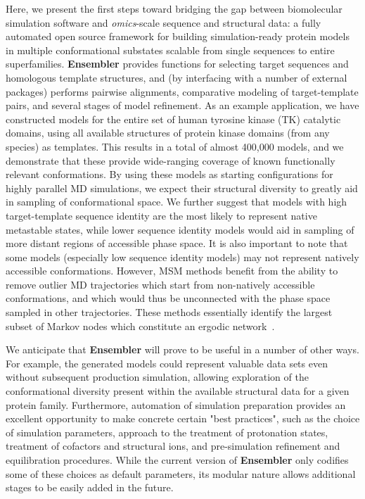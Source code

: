 \documentclass[aps,pre,twocolumn,nofootinbib,superscriptaddress,linenumbers]{revtex4-1}
\begin{document}
Here, we present the first steps toward bridging the gap between biomolecular simulation software and \emph{omics}-scale sequence and structural data: a fully automated open source framework for building simulation-ready protein models in multiple conformational substates scalable from single sequences to entire superfamilies.
{\bf Ensembler} provides functions for selecting target sequences and homologous template structures, and (by interfacing with a number of external packages) performs pairwise alignments, comparative modeling of target-template pairs, and several stages of model refinement.
As an example application, we have constructed models for the entire set of human tyrosine kinase (TK) catalytic domains, using all available structures of protein kinase domains (from any species) as templates.
This results in a total of almost 400,000 models, and we demonstrate that these provide wide-ranging coverage of known functionally relevant conformations.
By using these models as starting configurations for highly parallel MD simulations, we expect their structural diversity to greatly aid in sampling of conformational space.
We further suggest that models with high target-template sequence identity are the most likely to represent native metastable states, while lower sequence identity models would aid in sampling of more distant regions of accessible phase space.
It is also important to note that some models (especially low sequence identity models) may not represent natively accessible conformations.
However, MSM methods benefit from the ability to remove outlier MD trajectories which start from non-natively accessible conformations, and which would thus be unconnected with the phase space sampled in other trajectories.
These methods essentially identify the largest subset of Markov nodes which constitute an ergodic network~\cite{msmbuilder,caflisch:jpcb:2011:msm-subgraph}.

\color{red}
We anticipate that {\bf Ensembler} will prove to be useful in a number of other ways.
For example, the generated models could represent valuable data sets even without subsequent production simulation, allowing exploration of the conformational diversity present within the available structural data for a given protein family.
Furthermore, automation of simulation preparation provides an excellent opportunity to make concrete certain "best practices", such as the choice of simulation parameters, approach to the treatment of protonation states, treatment of cofactors and structural ions, and pre-simulation refinement and equilibration procedures.
While the current version of {\bf Ensembler} only codifies some of these choices as default parameters, its modular nature allows additional stages to be easily added in the future.
\color{black}
\end{document}
